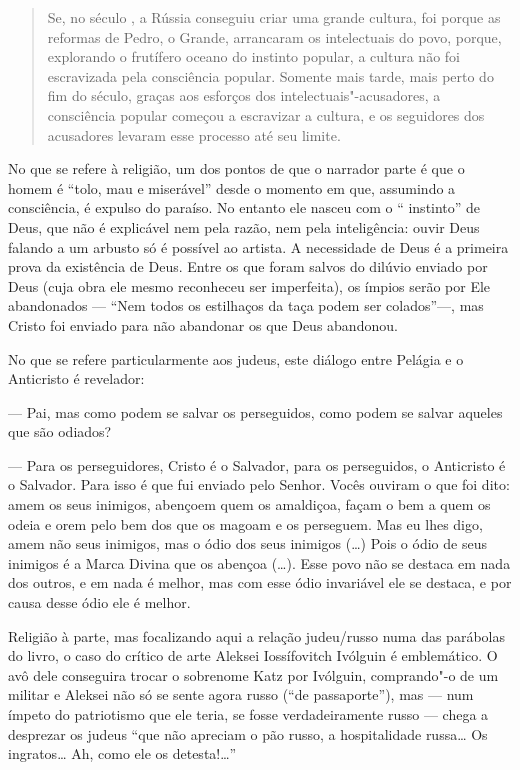 \begin{quote}
Se, no século , a Rússia conseguiu criar uma grande
cultura, foi porque as reformas de Pedro, o Grande, arrancaram os
intelectuais do povo, porque, explorando o frutífero oceano do instinto
popular, a cultura não foi escravizada pela consciência popular. Somente
mais tarde, mais perto do fim do século, graças aos esforços dos
intelectuais"-acusadores, a consciência popular começou a escravizar a
cultura, e os seguidores dos acusadores levaram esse processo até seu
limite.
\end{quote}

No que se refere à religião, um dos pontos de que o narrador parte é que
o homem é ``tolo, mau e miserável'' desde o momento em que, assumindo a
consciência, é expulso do paraíso. No entanto ele nasceu com o ``
instinto'' de Deus, que não é explicável nem pela razão, nem pela
inteligência: ouvir Deus falando a um arbusto só é possível ao artista.
A necessidade de Deus é a primeira prova da existência de Deus. Entre os
que foram salvos do dilúvio enviado por Deus (cuja obra ele mesmo
reconheceu ser imperfeita), os ímpios serão por Ele abandonados ---
``Nem todos os estilhaços da taça podem ser colados''---, mas Cristo
foi enviado para não abandonar os que Deus abandonou.

No que se refere particularmente aos judeus, este diálogo entre Pelágia
e o Anticristo é revelador:

--- Pai, mas como podem se salvar os perseguidos, como podem se salvar
aqueles que são odiados?

--- Para os perseguidores, Cristo é o Salvador, para os perseguidos, o
Anticristo é o Salvador. Para isso é que fui enviado pelo Senhor. Vocês
ouviram o que foi dito: amem os seus inimigos, abençoem quem os
amaldiçoa, façam o bem a quem os odeia e orem pelo bem dos que os magoam
e os perseguem. Mas eu lhes digo, amem não seus inimigos, mas o ódio dos
seus inimigos (\ldots{}) Pois o ódio de seus inimigos é a Marca Divina que os
abençoa (\ldots{}). Esse povo não se destaca em nada dos outros, e em nada é
melhor, mas com esse ódio invariável ele se destaca, e por causa desse
ódio ele é melhor.

Religião à parte, mas focalizando aqui a relação judeu/russo numa das
parábolas do livro, o caso do crítico de arte Aleksei Iossífovitch
Ivólguin é emblemático. O avô dele conseguira trocar o sobrenome Katz por
Ivólguin, comprando"-o de um militar e Aleksei não só se sente agora
russo (``de passaporte''), mas --- num ímpeto do patriotismo que ele
teria, se fosse verdadeiramente russo --- chega a desprezar os judeus
``que não apreciam o pão russo, a hospitalidade russa\ldots{} Os ingratos\ldots{}
Ah, como ele os detesta!\ldots{}''

